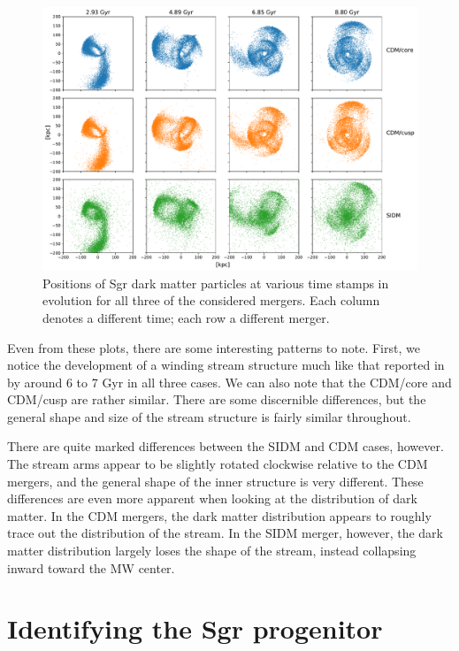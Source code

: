 \begin{figure}
    \centering
    \includegraphics[width=0.9\linewidth]{figs/darks.pdf}
    \caption{%
        Positions of Sgr dark matter particles at various time stamps in
        evolution for all three of the considered mergers. Each column denotes a
        different time; each row a different merger.
    }
    \label{fig:darks}
\end{figure}

Even from these plots, there are some interesting patterns to note. First, we
notice the development of a winding stream structure much like that reported
in~\cite{dierickx_predicted_2017} by around 6 to 7 Gyr in all three cases. We
can also note that the CDM/core and CDM/cusp are rather similar. There are some
discernible differences, but the general shape and size of the stream structure
is fairly similar throughout. 

There are quite marked differences between the SIDM and CDM cases, however.
The stream arms appear to be slightly rotated clockwise relative to the CDM
mergers, and the general shape of the inner structure is very different. These
differences are even more apparent when looking at the distribution of dark
matter. In the CDM mergers, the dark matter distribution appears to roughly
trace out the distribution of the stream. In the SIDM merger, however, the dark
matter distribution largely loses the shape of the stream, instead collapsing
inward toward the MW center.

\hypertarget{identifying-the-sgr-progenitor}{%
\section{Identifying the Sgr
progenitor}\label{identifying-the-sgr-progenitor}}


